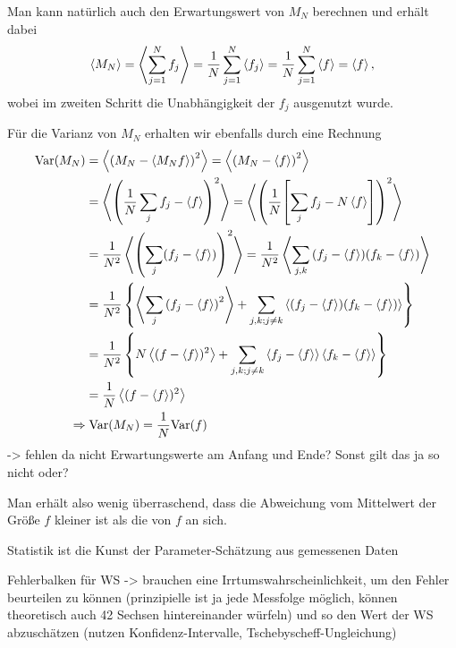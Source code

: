 Man kann natürlich auch den Erwartungswert von $M_N$ berechnen und erhält dabei
\begin{equation}\label{key}
\expval{M_N} = \expval{\sum\limits_{j=1}^N f_j} = \frac{1}{N} \sum\limits_{j=1}^N \expval{f_j} = \frac{1}{N} \sum\limits_{j=1}^N \expval{f} = \expval{f} ,
\end{equation}
wobei im zweiten Schritt die Unabhängigkeit der $f_j$ ausgenutzt wurde.

Für die Varianz von $M_N$ erhalten wir ebenfalls durch eine Rechnung
\begin{align}\label{key}
\text{Var}(M_N) & = \expval{\qty(M_N - \langle M_Nf \rangle)^2} = \expval{\qty(M_N - \expval{f})^2}
\notag\\
&= \expval{ \qty(\frac{1}{N} \sum\limits_j f_j - \expval{f})^2} = \expval{ \qty(\frac{1}{N} \qty[ \sum\limits_j f_j - N \expval{f}] )^2}
\notag\\
&= \frac{1}{N^2} \expval{ \qty(\sum\limits_j (f_j - \expval{f}) )^2} = \frac{1}{N^2} \expval{ \sum\limits_{j, k} \qty(f_j - \expval{f}) \qty(f_k - \expval{f})}
\notag\\
&= \frac{1}{N^2} \, \qty{ \expval{ \sum\limits_{j} \qty(f_j - \expval{f})^2 } + \sum\limits_{j, k; j \neq k} \expval{ \qty(f_j - \expval{f}) (f_k - \expval{f})} }
\notag\\
&= \frac{1}{N^2} \, \qty{ N \expval{(f - \expval{f})^2 } + \sum\limits_{j, k; j \neq k} \expval{ f_j - \expval{f} } \expval{ f_k - \expval{f} } }
\notag\\
&= \frac{1}{N} \expval{(f - \expval{f})^2 }
\notag\\
\Rightarrow&  \; \text{Var}(M_N) = \frac{1}{N} \text{Var}(f)
\end{align}
-> fehlen da nicht Erwartungswerte am Anfang und Ende? Sonst gilt das ja so nicht oder?


Man erhält also wenig überraschend, dass die Abweichung vom Mittelwert der Größe $f$ kleiner ist als die von $f$ an sich.




Statistik ist die Kunst der Parameter-Schätzung aus gemessenen Daten

Fehlerbalken für WS -> brauchen eine Irrtumswahrscheinlichkeit, um den Fehler beurteilen zu können (prinzipielle ist ja jede Messfolge möglich, können theoretisch auch 42 Sechsen hintereinander würfeln) und so den Wert der WS abzuschätzen (nutzen Konfidenz-Intervalle, Tschebyscheff-Ungleichung)

